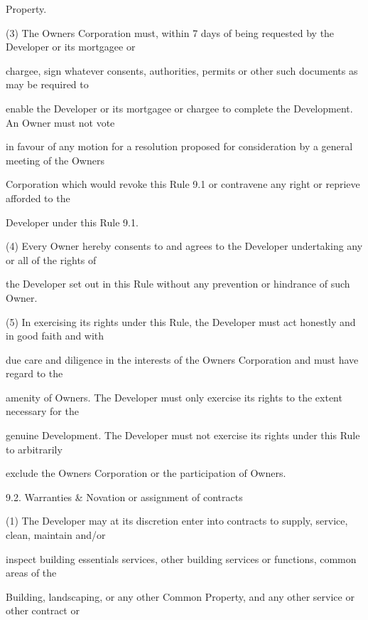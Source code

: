 \documentclass{article}
\begin{document}
{\fontsize{10.02}{1}Property. }

{\fontsize{9.962}{1}(3) The Owners Corporation must, within 7 days of being requested by the Developer or its mortgagee or }

{\fontsize{10.02}{1}chargee, sign whatever consents, authorities, permits or other such documents as may be required to }

{\fontsize{10.02}{1}enable the Developer or its mortgagee or chargee to complete the Development. An Owner must not vote }

{\fontsize{10.02}{1}in favour of any motion for a resolution proposed for consideration by a general meeting of the Owners }

{\fontsize{10.02}{1}Corporation which would revoke this Rule 9.1 or contravene any right or reprieve afforded to the }

{\fontsize{10.02}{1}Developer under this Rule 9.1. }

{\fontsize{9.962}{1}(4) Every Owner hereby consents to and agrees to the Developer undertaking any or all of the rights of }

{\fontsize{10.02}{1}the Developer set out in this Rule without any prevention or hindrance of such Owner. }

{\fontsize{9.962}{1}(5) In exercising its rights under this Rule, the Developer must act honestly and in good faith and with }

{\fontsize{10.02}{1}due care and diligence in the interests of the Owners Corporation and must have regard to the }

{\fontsize{10.02}{1}amenity of Owners. The Developer must only exercise its rights to the extent necessary for the }

{\fontsize{10.02}{1}genuine Development. The Developer must not exercise its rights under this Rule to arbitrarily }

{\fontsize{10.02}{1}exclude the Owners Corporation or the participation of Owners. }

{\fontsize{9.99}{1}9.2. Warranties \& Novation or assignment of contracts }

{\fontsize{9.962}{1}(1) The Developer may at its discretion enter into contracts to supply, service, clean, maintain and/or }

{\fontsize{10.02}{1}inspect building essentials services, other building services or functions, common areas of the }

{\fontsize{10.02}{1}Building, landscaping, or any other Common Property, and any other service or other contract or }
\end{document}
